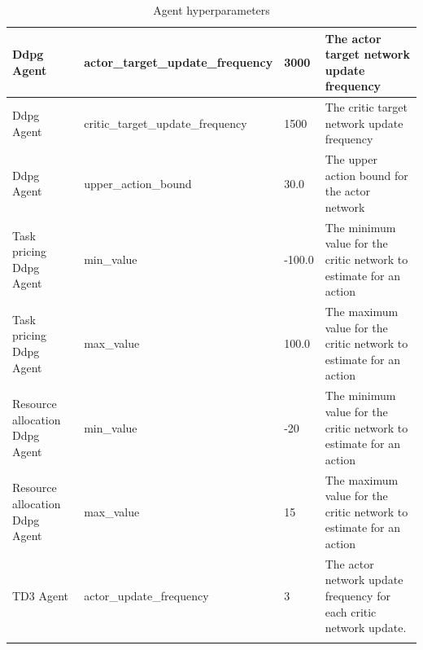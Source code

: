 \begin{longtable}{|p{2.5cm}|p{3cm}|p{3cm}|p{4cm}|}
        Ddpg Agent & actor\_target\_update\_frequency & 3000 & The actor target network update frequency \\ \hline
        Ddpg Agent & critic\_target\_update\_frequency & 1500 & The critic target network update frequency \\ \hline
        Ddpg Agent & upper\_action\_bound & 30.0 & The upper action bound for the actor network \\ \hline
        Task pricing Ddpg Agent & min\_value & -100.0 & The minimum value for the critic network to estimate for an
            action \\ \hline
        Task pricing Ddpg Agent & max\_value & 100.0 & The maximum value for the critic network to estimate for an
            action\\ \hline \hline
        Resource allocation Ddpg Agent & min\_value & -20 & The minimum value for the critic network to estimate for an
            action \\ \hline
        Resource allocation Ddpg Agent & max\_value & 15 & The maximum value for the critic network to estimate for an
            action\\ \hline
        TD3 Agent & actor\_update\_frequency & 3 & The actor network update frequency for each critic network update. \\ \hline
    \caption{Agent hyperparameters}
    \label{tab:agent_hyperparameters}
\end{longtable}


